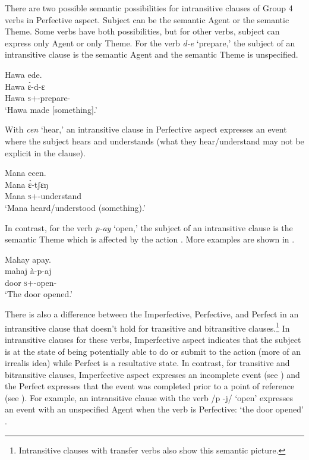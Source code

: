 There are two possible semantic possibilities for intransitive clauses of Group 4 verbs in Perfective aspect. Subject can be the semantic Agent or the semantic Theme. Some verbs have both possibilities, but for other verbs, subject can express only Agent or only Theme. For the verb \textit{d-e} ‘prepare,’ the subject of an intransitive clause is the semantic Agent  and the semantic Theme is unspecified. 

\ea \label{ex:9:25}
Hawa  ede. \\
\gll  Hawa   \`ɛ{}-d-ɛ \\
      Hawa  \textsc{s}+{\PFV}-prepare-{\CL}\\
\glt  ‘Hawa made [something].’ 
\z

With \textit{cen} ‘hear,’ an intransitive clause in Perfective aspect  expresses an event where the subject hears and understands (what they hear/understand may not be explicit in the clause). 

\ea \label{ex:9:26}
Mana  ecen. \\
\gll  Mana   \`ɛ{}-tʃɛŋ \\
      Mana  \textsc{s}+{\PFV}-understand\\
\glt  ‘Mana heard/understood (something).’
\z

In contrast, for the verb \textit{p-ay} ‘open,’ the subject of an intransitive clause is the semantic Theme which is affected by the action . More examples are shown in .

\clearpage
\ea \label{ex:9:27}
Mahay  apay.\\
\gll  mahaj   à-p-aj\\
      door  \textsc{s}+{\PFV}-open{}-{\CL}\\
\glt  ‘The door opened.’ 
\z

There is also a difference between the Imperfective, Perfective, and Perfect in an intransitive clause that doesn’t hold for transitive and bitransitive clauses.\footnote{Intransitive clauses with transfer verbs  also show this semantic picture.} In intransitive clauses for these verbs, Imperfective aspect indicates that the subject is at the state of being potentially able to do or submit to the action (more of an irrealis idea) while Perfect is a resultative state. In contrast, for transitive and bitransitive clauses, Imperfective aspect expresses an incomplete event  (see ) and the Perfect expresses that the event was completed prior to a point of reference (see ).  For example, an intransitive clause with the verb /p -j/ ‘open’ expresses an event with an unspecified Agent when the verb is Perfective: ‘the door opened’ . 

